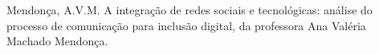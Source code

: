 \documentclass[
12pt,		%
openright,	%
twoside,  %
a4paper,			%
chapter=TITLE,		%
english,			%
french,				%
spanish,			%
brazil				%
]{USPSC-classe/USPSC}
\begin{document}
\begin{flushleft}
\begin{flushleft}
\begin{flushleft}
\begin{flushleft}
\begin{flushleft}
\begin{flushleft}
\begin{flushleft}
\begin{flushleft}
\begin{flushleft}
\begin{flushleft}
\begin{flushleft}
\begin{flushleft}
\begin{flushleft}
\begin{flushleft}
[MENDON\c{C}A, 2015] Mendon\c{c}a, A.V.M. A integra\c{c}\~ao de redes sociais e tecnol\'ogicas: an\'alise do processo de comunica\c{c}\~ao para inclus\~ao digital, da professora Ana Val\'eria  Machado  Mendon\c{c}a.
\end{flushleft}


\end{flushleft}


\end{flushleft}


\end{flushleft}


\end{flushleft}


\end{flushleft}


\end{flushleft}


\end{flushleft}


\end{flushleft}


\end{flushleft}


\end{flushleft}


\end{flushleft}


\end{flushleft}


\end{flushleft}
\end{document}
